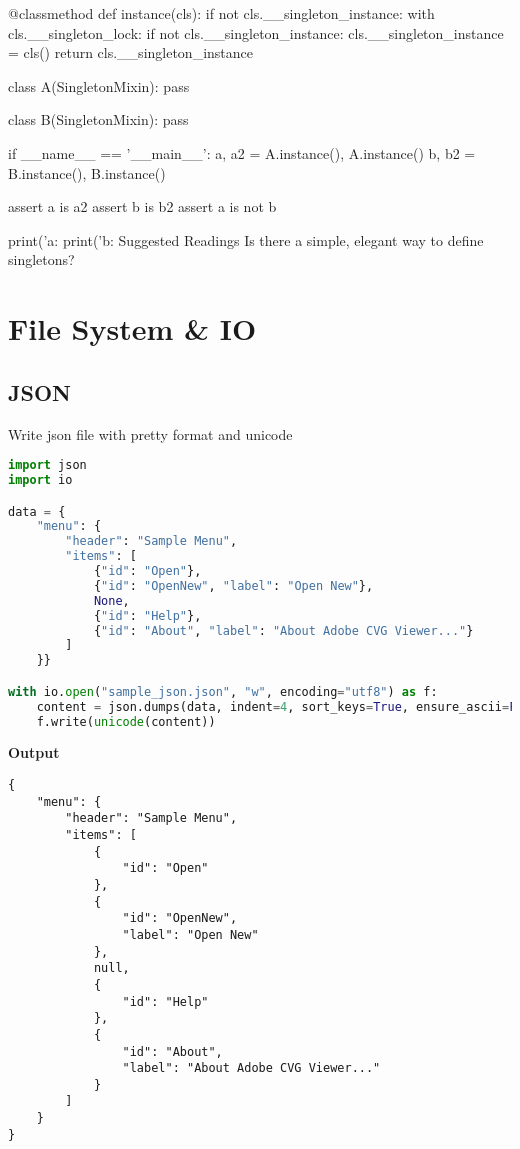     @classmethod
    def instance(cls):
        if not cls.__singleton_instance:
            with cls.__singleton_lock:
                if not cls.__singleton_instance:
                    cls.__singleton_instance = cls()
        return cls.__singleton_instance

class A(SingletonMixin):
    pass

class B(SingletonMixin):
    pass

if __name__ == '__main__':
    a, a2 = A.instance(), A.instance()
    b, b2 = B.instance(), B.instance()

    assert a is a2
    assert b is b2
    assert a is not b

    print('a:  %
    print('b:  %
Suggested Readings
Is there a simple, elegant way to define singletons?

\section{File System \& IO}

\subsection{JSON}

Write json file with pretty format and unicode

\begin{lstlisting}[language=Python]
import json
import io

data = {
    "menu": {
        "header": "Sample Menu",
        "items": [
            {"id": "Open"},
            {"id": "OpenNew", "label": "Open New"},
            None,
            {"id": "Help"},
            {"id": "About", "label": "About Adobe CVG Viewer..."}
        ]
    }}

with io.open("sample_json.json", "w", encoding="utf8") as f:
    content = json.dumps(data, indent=4, sort_keys=True, ensure_ascii=False)
    f.write(unicode(content))
\end{lstlisting}

\textbf{Output}

\begin{lstlisting}
{
    "menu": {
        "header": "Sample Menu",
        "items": [
            {
                "id": "Open"
            },
            {
                "id": "OpenNew",
                "label": "Open New"
            },
            null,
            {
                "id": "Help"
            },
            {
                "id": "About",
                "label": "About Adobe CVG Viewer..."
            }
        ]
    }
}
\end{lstlisting}

